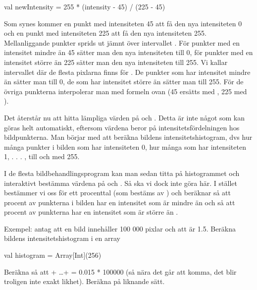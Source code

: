 \begin{Code}
val newIntensity = 255 * (intensity - 45) / (225 - 45)
\end{Code}

Som synes kommer en punkt med intensiteten 45 att få den nya intensiteten 0 och en punkt med intensiteten 225 att få den nya intensiteten 255. Mellanliggande punkter sprids ut jämnt över intervallet \code{[0, 255]}. För punkter med en intensitet mindre än 45 sätter man den nya intensiteten till 0, för punkter med en intensitet större än 225 sätter man den nya intensiteten till 255. Vi kallar intervallet där de flesta pixlarna finns för . De punkter som har intensitet mindre än  sätter man till 0, de som har intensitet större än  sätter man till 255. För de övriga punkterna interpolerar man med formeln ovan (45 ersätts med , 225 med ).

Det återstår nu att hitta lämpliga värden på  och . Detta är inte något som kan göras helt automatiskt, eftersom värdena beror på intensitetsfördelningen hos bildpunkterna. Man börjar med att beräkna bildens intensitetshistogram, dvs hur många punkter i bilden som har intensiteten 0, hur många som har intensiteten 1, . . . , till och med 255.

I de flesta bildbehandlingsprogram kan man sedan titta på histogrammet och interaktivt bestämma värdena på  och . Så ska vi dock inte göra här. I stället bestämmer vi oss för ett procenttal  (som bestäms av ) och beräknar  så att  procent av punkterna i bilden har en intensitet som är mindre än  och  så att  procent av punkterna har en intensitet som är större än .

Exempel: antag att en bild innehåller 100 000 pixlar och att  är 1.5. Beräkna bildens intensitetshistogram i en array
\begin{Code}
val histogram = Array[Int](256)
\end{Code}

Beräkna  så att  + \ldots +  = 0.015 * 100000 (så nära det går att komma, det blir troligen inte exakt likhet). Beräkna  på liknande sätt.

